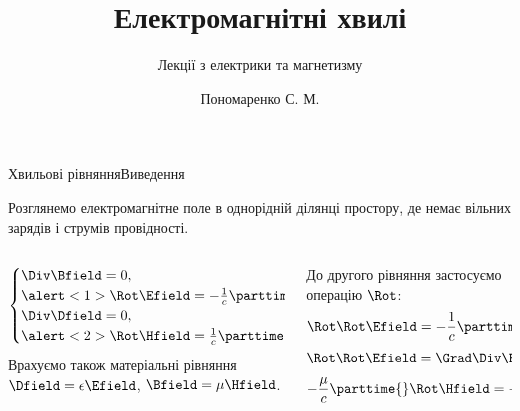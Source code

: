 \documentclass[onlytextwidth]{beamer}
\title[Лекції електрики та магнетизму]{\huge\bfseries Електромагнітні хвилі}
\subtitle{Лекції з електрики та магнетизму}
\author{Пономаренко С. М.}
\date{}
\begin{document}
\begin{frame}[plain]
	\maketitle
\end{frame}

\begin{frame}{Хвильові рівняння}{Виведення}\small
	\begin{block}{}\justifying
		Розглянемо електромагнітне поле в однорідній ділянці простору, де немає вільних зарядів і струмів провідності.
	\end{block}
	\begin{columns}
		\begin{column}{0.45\linewidth}
			\begin{block}{}\justifying
				\begin{equation*}
					\begin{cases}
						\Div\Bfield = 0,                          \\
						\alert<1>{\Rot\Efield = -\frac1c\parttime{\Bfield}}, \\
						\Div\Dfield = 0,                          \\
						\alert<2>{\Rot\Hfield = \frac1c\parttime{\Dfield}}.
					\end{cases}
				\end{equation*}
				Врахуємо також матеріальні рівняння $\Dfield = \epsilon\Efield$, $\Bfield = \mu\Hfield$.
			\end{block}
		\end{column}
		\quad
		\begin{column}{0.55\linewidth}
			\begin{overprint}
				\begin{block}{}
					До другого рівняння застосуємо операцію $\Rot$:
					\begin{equation*}
						\Rot\Rot\Efield = - \frac1c \parttime{} \Rot\Bfield.
					\end{equation*}
					\begin{equation*}
						\Rot\Rot\Efield =\Grad\Div\Efield - \nabla^2\Efield.
					\end{equation*}
					\begin{equation*}
						- \frac{\mu}c \parttime{}\Rot\Hfield = - \frac{\epsilon\mu}{c^2}\pparttime{\Efield}  .
					\end{equation*}
				\end{block}

\end{overprint}
\end{column}
\end{columns}
\end{frame}
\end{document}
